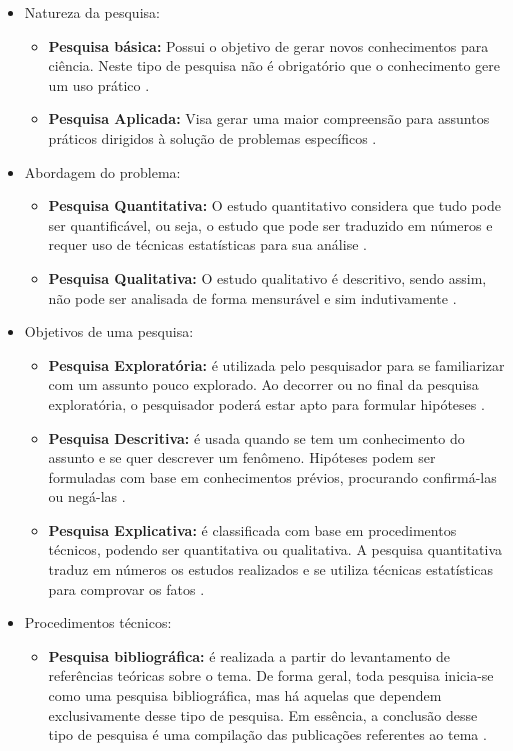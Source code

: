 \begin{itemize}
\item Natureza da pesquisa:
    \begin{itemize}
    \item \textbf{Pesquisa básica:} Possui o objetivo de gerar novos conhecimentos para ciência. Neste tipo de pesquisa não é obrigatório que o conhecimento gere um uso prático \cite{Tafner:2007}.
    \item \textbf{Pesquisa Aplicada:} Visa gerar uma maior compreensão para assuntos práticos dirigidos à solução de problemas específicos \cite{Tafner:2007}.
    \end{itemize}
\item Abordagem do problema:
    \begin{itemize}
    \item \textbf{Pesquisa Quantitativa:} O estudo quantitativo considera que tudo pode ser quantificável, ou seja, o estudo que pode ser traduzido em números e requer uso de técnicas estatísticas para sua análise \cite{Travassos:2002}.
    \item \textbf{Pesquisa Qualitativa:} O estudo qualitativo é descritivo, sendo assim, não pode ser analisada de forma mensurável e sim indutivamente \cite{Travassos:2002}.
    \end{itemize}
\item Objetivos de uma pesquisa:
    \begin{itemize}
    \item \textbf{Pesquisa Exploratória:} é utilizada pelo pesquisador para se familiarizar com um assunto pouco explorado. Ao decorrer ou no final da pesquisa exploratória, o pesquisador poderá estar apto para formular hipóteses \cite{Gil:2008}.
    \item \textbf{Pesquisa Descritiva:} é usada quando se tem um conhecimento do assunto e se quer descrever um fenômeno. Hipóteses podem ser formuladas com base em conhecimentos prévios, procurando confirmá-las ou negá-las \cite{Gil:2008}.
    \item \textbf{Pesquisa Explicativa:} é classificada com base em procedimentos técnicos, podendo ser quantitativa ou qualitativa. A pesquisa quantitativa traduz em números os estudos realizados e se utiliza técnicas estatísticas para comprovar os fatos \cite{Gil:2008}.
    \end{itemize}
\item Procedimentos técnicos:
    \begin{itemize}
    \item \textbf{Pesquisa bibliográfica:} é realizada a partir do levantamento de referências teóricas sobre o tema. De forma geral, toda pesquisa inicia-se como uma pesquisa bibliográfica, mas há aquelas que dependem exclusivamente desse tipo de pesquisa. Em essência, a conclusão desse tipo de pesquisa é uma compilação das publicações referentes ao tema \cite{Tafner:2007}.

\end{itemize}
\end{itemize}
